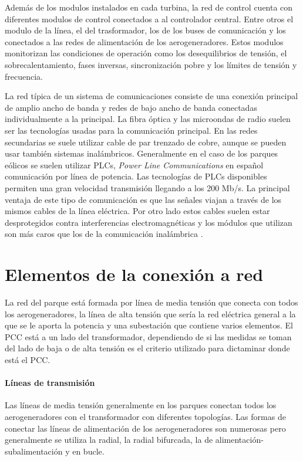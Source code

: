 \documentclass{book}
\begin{document}
		Adem\'as de los modulos instalados en cada turbina, la red de control cuenta con diferentes modulos de control conectados a al controlador central. Entre otros el modulo de la l\'inea, el del trasformador, los de los buses de comunicaci\'on y los conectados a las redes de alimentaci\'on de los aerogeneradores. Estos modulos monitorizan las condiciones de operaci\'on como los desequilibrios de tensi\'on, el sobrecalentamiento, fases inversas, sincronizaci\'on pobre y los l\'imites de tensi\'on y frecuencia\cite{ComunicationControl}.   \par
		La red t\'ipica de un sistema de comunicaciones consiste de una conexi\'on principal de amplio ancho de banda y redes de bajo ancho de banda conectadas individualmente a la principal. La fibra \'optica y las microondas de radio suelen ser las tecnolog\'ias usadas para la comunicaci\'on principal. En las redes secundarias se suele utilizar cable de par trenzado de cobre, aunque se pueden usar tambi\'en sistemas inal\'ambricos. Generalmente en el caso de los parques e\'olicos se suelen utilizar PLCs, \emph{Power Line Communications} en español comunicaci\'on por l\'inea de potencia. Las tecnolog\'ias de PLCs disponibles permiten una gran velocidad transmisi\'on llegando a los 200 Mb/s. La principal ventaja de este tipo de comunicaci\'on es que las señales viajan a trav\'es de los mismos cables de la l\'inea el\'ectrica. Por otro lado estos cables suelen estar desprotegidos contra interferencias electromagn\'eticas y los m\'odulos que utilizan son m\'as caros que los de la comunicaci\'on inal\'ambrica \cite{ComunicationWF}. \par
	
	\section{Elementos de la conexi\'on a red}
	
	La red del parque est\'a formada por l\'inea de media tensi\'on que conecta con todos los aerogeneradores, la l\'inea de alta tensi\'on que ser\'ia la red el\'ectrica general a la que se le aporta la potencia y una subestaci\'on que contiene varios elementos. El PCC est\'a a un lado del transformador, dependiendo de si las medidas se toman del lado de baja o de alta tensi\'on es el criterio utilizado para dictaminar donde est\'a el PCC. \par
		\paragraph {L\'ineas de transmisi\'on}
Las l\'ineas de media tensi\'on generalmente en los parques conectan todos los aerogeneradores con el transformador con diferentes topolog\'ias. Las formas de conectar las l\'ineas de alimentaci\'on de los aerogeneradores son numerosas pero generalmente se utiliza la radial, la radial bifurcada, la de alimentaci\'on-subalimentaci\'on y en bucle. \par
\end{document}
